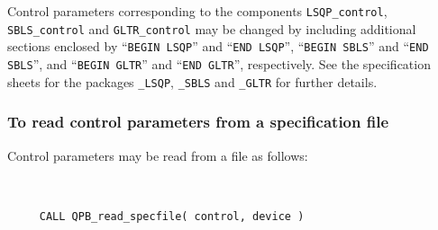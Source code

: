 \documentclass{galahad}
\begin{document}
Control parameters corresponding to the components 
{\tt LSQP\_control}, 
{\tt SBLS\_control}
and
{\tt GLTR\_control} may be changed by including additional sections enclosed by
``{\tt BEGIN LSQP}'' and 
``{\tt END LSQP}'', 
``{\tt BEGIN SBLS}'' and 
``{\tt END SBLS}'', and
``{\tt BEGIN GLTR}'' and 
``{\tt END GLTR}'', respectively. 
See the specification sheets for the packages 
{\tt \libraryname\_LSQP},
{\tt \libraryname\_SBLS} 
and
{\tt \libraryname\_GLTR}
for further details.

\subsubsection{To read control parameters from a specification file}
\label{readspec}

Control parameters may be read from a file as follows:
\hskip0.5in 
\def\baselinestretch{0.8} {\tt 
\begin{verbatim}
     CALL QPB_read_specfile( control, device )
\end{verbatim}
}
\def\baselinestretch{1.0}
\end{document}
